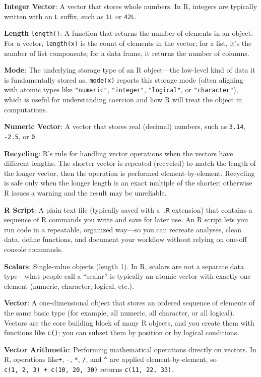 \documentclass[
  12pt,
]{scrreprt}
\begin{document}
\textbf{Integer Vector}: A vector that stores whole numbers. In R,
integers are typically written with an \texttt{L} suffix, such as
\texttt{1L} or \texttt{42L}.

\textbf{Length} \texttt{length()}: A function that returns the number of
elements in an object. For a vector, \texttt{length(x)} is the count of
elements in the vector; for a list, it's the number of list components;
for a data frame, it returns the number of columns.

\textbf{Mode}: The underlying storage type of an R object---the
low-level kind of data it is fundamentally stored as. \texttt{mode(x)}
reports this storage mode (often aligning with atomic types like
\texttt{"numeric"}, \texttt{"integer"}, \texttt{"logical"}, or
\texttt{"character"}), which is useful for understanding coercion and
how R will treat the object in computations.

\textbf{Numeric Vector}: A vector that stores real (decimal) numbers,
such as \texttt{3.14}, \texttt{-2.5}, or \texttt{0}.

\textbf{Recycling}: R's rule for handling vector operations when the
vectors have different lengths. The shorter vector is repeated
(recycled) to match the length of the longer vector, then the operation
is performed element-by-element. Recycling is safe only when the longer
length is an exact multiple of the shorter; otherwise R issues a warning
and the result may be unreliable.

\textbf{R Script}: A plain-text file (typically saved with a \texttt{.R}
extension) that contains a sequence of R commands you write and save for
later use. An R script lets you run code in a repeatable, organized
way---so you can recreate analyses, clean data, define functions, and
document your workflow without relying on one-off console commands.

\textbf{Scalars}: Single-value objects (length 1). In R, scalars are not
a separate data type---what people call a ``scalar'' is typically an
atomic vector with exactly one element (numeric, character, logical,
etc.).

\textbf{Vector}: A one-dimensional object that stores an ordered
sequence of elements of the same basic type (for example, all numeric,
all character, or all logical). Vectors are the core building block of
many R objects, and you create them with functions like \texttt{c()};
you can subset them by position or by logical conditions.

\textbf{Vector Arithmetic}: Performing mathematical operations directly
on vectors. In R, operations like\texttt{+}, \texttt{-}, \texttt{*},
\texttt{/}, and \texttt{\^{}} are applied element-by-element, so
\texttt{c(1,\ 2,\ 3)\ +\ c(10,\ 20,\ 30)} returns
\texttt{c(11,\ 22,\ 33)}.
\end{document}
